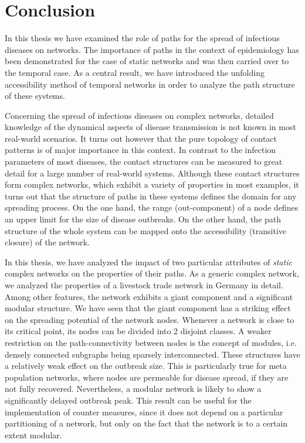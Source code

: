 \chapter{Conclusion}
In this thesis we have examined the role of paths for the spread of infectious diseases on networks.
The importance of paths in the context of epidemiology has been demonstrated for the case of static networks and was then carried over to the temporal case.
As a central result, we have introduced the unfolding accessibility method of temporal networks in order to analyze the path structure of these systems.

Concerning the spread of infectious diseases on complex networks, detailed knowledge of the dynamical aspects of disease transmission is not known in most real-world scenarios.
It turns out however that the pure topology of contact patterns is of major importance in this context.
In contrast to the infection parameters of most diseases, the contact structures can be measured to great detail for a large number of real-world systems.
Although these contact structures form complex networks, which exhibit a variety of properties in most examples, it turns out that the structure of paths in these systems defines the domain for any spreading process.
On the one hand, the range (out-component) of a node defines an upper limit for the size of disease outbreaks.
On the other hand, the path structure of the whole system can be mapped onto the accessibility (transitive closure) of the network.

In this thesis, we have analyzed the impact of two particular attributes of \emph{static} complex networks on the properties of their paths.
As a generic complex network, we analyzed the properties of a livestock trade network in Germany in detail.
Among other features, the network exhibits a giant component and a significant modular structure.
We have seen that the giant component has a striking effect on the spreading potential of the network nodes.
Whenever a network is close to its critical point, its nodes can be divided into 2 disjoint classes.
A weaker restriction on the path-connectivity between nodes is the concept of modules, i.e. densely connected subgraphs being sparsely interconnected.
These structures have a relatively weak effect on the outbreak size.
This is particularly true for meta population networks, where nodes are permeable for disease spread, if they are not fully recovered.
Nevertheless, a modular network is likely to show a significantly delayed outbreak peak.
This result can be useful for the implementation of counter measures, since it does not depend on a particular partitioning of a network, but only on the fact that the network is to a certain extent modular.

